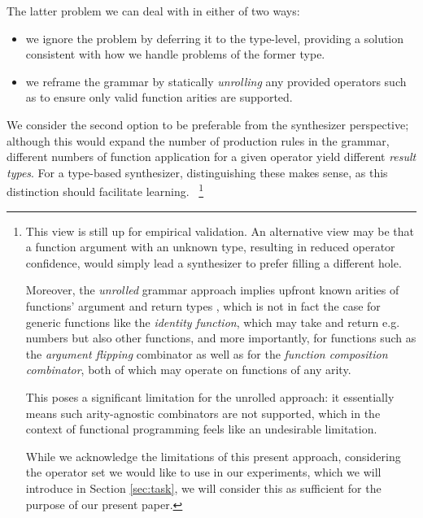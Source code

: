 \documentclass{article}
\begin{document}
The latter problem we can deal with in either of two ways:
\begin{itemize}
    \item we ignore the problem by deferring it to the type-level,
    providing a solution consistent with how we handle problems of the former type.
    \item we reframe the grammar by statically \emph{unrolling} any provided operators such as to ensure only valid function arities are supported.
\end{itemize}

We consider the second option to be preferable from the synthesizer perspective;
although this would expand the number of production rules in the grammar,
different numbers of function application for a given operator yield different \emph{result types}.
For a type-based synthesizer, distinguishing these makes sense,
as this distinction should facilitate learning.%
~\footnote{
    This view is still up for empirical validation.
    An alternative view may be that a function argument with an unknown type,
    resulting in reduced operator confidence,
    would simply lead a synthesizer to prefer filling a different hole.

    Moreover, the \emph{unrolled} grammar approach implies upfront known arities of functions' argument and return types%
    ,
    which is not in fact the case for generic functions like the \emph{identity function},
    which may take and return e.g. numbers but also other functions,
    and more importantly, for functions such as the \emph{argument flipping} combinator
    as well as for the \emph{function composition combinator},
    both of which may operate on functions of any arity.

    This poses a significant limitation for the unrolled approach:
    it essentially means such arity-agnostic combinators are not supported,
    which in the context of functional programming feels like an undesirable limitation.

    While we acknowledge the limitations of this present approach,
    considering the operator set we would like to use in our experiments,
    which we will introduce in Section \ref{sec:task},
    we will consider this as sufficient for the purpose of our present paper.

}
\end{document}
